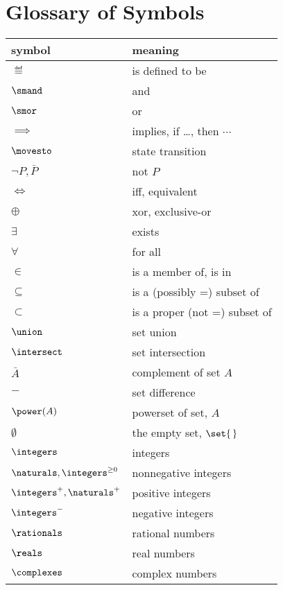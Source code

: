 \section*{Glossary of Symbols}

\iffalse
\begin{center}
\large \textbf{Glossary of Symbols}
\end{center}
\fi

\begin{center}
\begin{tabular}{ll}
symbol         &  meaning\\
\hline
$\eqdef$       & is defined to be\\
$\smand$       & and\\
$\smor$        & or\\
$\implies$     & implies, if \dots, then $\cdots$\\
$\movesto$     & state transition\\
$\neg P, \bar{P}$      & not $P$\\
$\iff$         & iff, equivalent\\
$\oplus$       & xor, exclusive-or\\
$\exists$      & exists\\
$\forall$      & for all\\
$\in$          & is a member of, is in\\
$\subseteq$    & is a (possibly =) subset of\\
$\subset$      & is a proper (not =) subset of\\
$\union$       & set union\\
$\intersect$   & set intersection\\
$\bar{A}$      & complement of set $A$\\
$-$            & set difference\\
$\power(A)$    & powerset of set, $A$\\
$\emptyset$    & the empty set, $\set{\,}$\\
$\integers$    & integers\\
$\naturals, \integers^{\ge 0}$    & nonnegative integers \\
$\integers^{+},\naturals^{+}$ & positive integers\\
$\integers^{-}$ & negative integers\\
$\rationals$   & rational numbers\\
$\reals$       & real numbers\\
$\complexes$   & complex numbers\\

\end{tabular}
\end{center}
